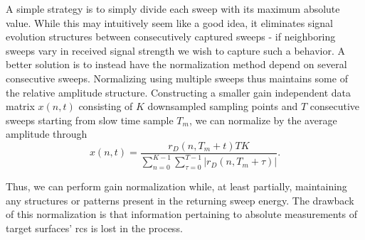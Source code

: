 A simple strategy is to simply divide each sweep with its maximum absolute value. While this may intuitively seem like a good idea, it eliminates signal evolution structures between consecutively captured sweeps - if neighboring sweeps vary in received signal strength we wish to capture such a behavior. A better solution is to instead have the normalization method depend on several consecutive sweeps. Normalizing using multiple sweeps thus maintains some of the relative amplitude structure. Constructing a smaller gain independent data matrix $x(n,t)$ consisting of $K$ downsampled sampling points and $T$ consecutive sweeps starting from slow time sample $T_m$, we can normalize by the average amplitude through
\begin{equation}
	x(n,t) = 
	\frac{r_D(n, T_m + t)TK}{\sum_{n=0}^{K-1}\sum_{\tau=0}^{T-1}|r_D(n, T_m+\tau)|}.
\end{equation}

Thus, we can perform gain normalization while, at least partially, maintaining any structures or patterns present in the returning sweep energy. The drawback of this normalization is that information pertaining to absolute measurements of target surfaces' \gls{rcs} is lost in the process.

